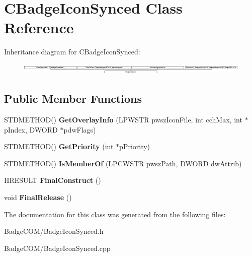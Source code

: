 \hypertarget{class_c_badge_icon_synced}{\section{C\-Badge\-Icon\-Synced Class Reference}
\label{class_c_badge_icon_synced}
}
Inheritance diagram for C\-Badge\-Icon\-Synced\-:\begin{figure}[H]
\begin{center}
\leavevmode
\includegraphics[height=0.538462cm]{class_c_badge_icon_synced}
\end{center}
\end{figure}
\subsection*{Public Member Functions}
\begin{DoxyCompactItemize}
\item 
\hypertarget{class_c_badge_icon_synced_aa6e3b3617ce6928698da7793363818f0}{S\-T\-D\-M\-E\-T\-H\-O\-D() {\bfseries Get\-Overlay\-Info} (L\-P\-W\-S\-T\-R pwsz\-Icon\-File, int cch\-Max, int $\ast$p\-Index, D\-W\-O\-R\-D $\ast$pdw\-Flags)}\label{class_c_badge_icon_synced_aa6e3b3617ce6928698da7793363818f0}

\item 
\hypertarget{class_c_badge_icon_synced_afdaf7d8e2bc26c0b3607250dd0d35440}{S\-T\-D\-M\-E\-T\-H\-O\-D() {\bfseries Get\-Priority} (int $\ast$p\-Priority)}\label{class_c_badge_icon_synced_afdaf7d8e2bc26c0b3607250dd0d35440}

\item 
\hypertarget{class_c_badge_icon_synced_ac7f4c8bc13115e04f177f3ddc68bb085}{S\-T\-D\-M\-E\-T\-H\-O\-D() {\bfseries Is\-Member\-Of} (L\-P\-C\-W\-S\-T\-R pwsz\-Path, D\-W\-O\-R\-D dw\-Attrib)}\label{class_c_badge_icon_synced_ac7f4c8bc13115e04f177f3ddc68bb085}

\item 
\hypertarget{class_c_badge_icon_synced_a03db546e8db5989b493e97ee1a94a6a0}{H\-R\-E\-S\-U\-L\-T {\bfseries Final\-Construct} ()}\label{class_c_badge_icon_synced_a03db546e8db5989b493e97ee1a94a6a0}

\item 
\hypertarget{class_c_badge_icon_synced_aafc059b6efb331ac2a1586969185ef67}{void {\bfseries Final\-Release} ()}\label{class_c_badge_icon_synced_aafc059b6efb331ac2a1586969185ef67}

\end{DoxyCompactItemize}


The documentation for this class was generated from the following files\-:\begin{DoxyCompactItemize}
\item 
Badge\-C\-O\-M/Badge\-Icon\-Synced.\-h\item 
Badge\-C\-O\-M/Badge\-Icon\-Synced.\-cpp\end{DoxyCompactItemize}
